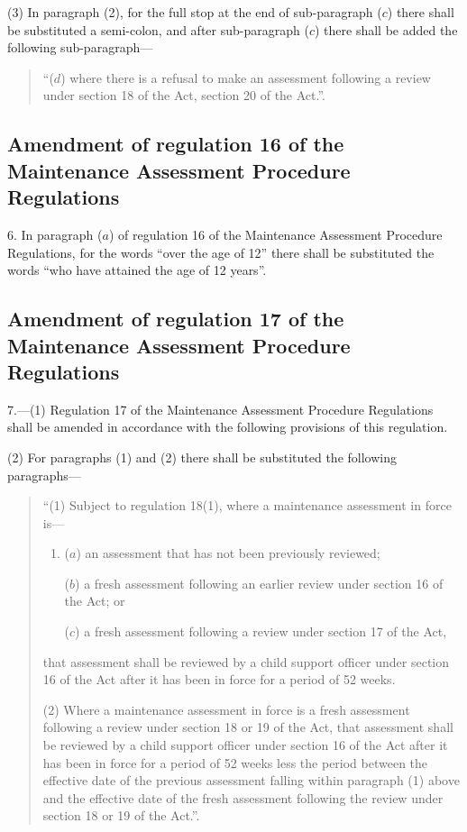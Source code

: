 \documentclass[12pt,a4paper]{article}
\begin{document}
(3) In paragraph (2), for the full stop at the end of sub-paragraph ($c$) there shall be substituted a semi-colon, and after sub-paragraph ($c$) there shall be added the following sub-paragraph---
\begin{quotation}
“($d$) where there is a refusal to make an assessment following a review under section 18 of the Act, section 20 of the Act.”.
\end{quotation}

\subsection[6. Amendment of regulation 16 of the Maintenance Assessment Procedure Regulations]{Amendment of regulation 16 of the Maintenance Assessment Procedure Regulations}

6.  In paragraph ($a$) of regulation 16 of the Maintenance Assessment Procedure Regulations, for the words “over the age of 12” there shall be substituted the words “who have attained the age of 12 years”.

\subsection[7. Amendment of regulation 17 of the Maintenance Assessment Procedure Regulations]{Amendment of regulation 17 of the Maintenance Assessment Procedure Regulations}

7.—(1) Regulation 17 of the Maintenance Assessment Procedure Regulations shall be amended in accordance with the following provisions of this regulation.

(2) For paragraphs (1) and (2) there shall be substituted the following paragraphs---
\begin{quotation}
“(1) Subject to regulation 18(1), where a maintenance assessment in force is---
\begin{enumerate}\item[]
($a$) an assessment that has not been previously reviewed;

($b$) a fresh assessment following an earlier review under section 16 of the Act; or

($c$) a fresh assessment following a review under section 17 of the Act,
\end{enumerate}
that assessment shall be reviewed by a child support officer under section 16 of the Act after it has been in force for a period of 52 weeks.

(2) Where a maintenance assessment in force is a fresh assessment following a review under section 18 or 19 of the Act, that assessment shall be reviewed by a child support officer under section 16 of the Act after it has been in force for a period of 52 weeks less the period between the effective date of the previous assessment falling within paragraph (1) above and the effective date of the fresh assessment following the review under section 18 or 19 of the Act.”.
\end{quotation}
\end{document}
